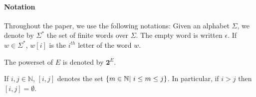 \paragraph{Notation} Throughout the paper, we use the following
notations: Given an alphabet $\Sigma$, we denote by $\Sigma^*$
 the set of finite words over $\Sigma$. The empty word is written $\epsilon$. If $w\in \Sigma^*$, $w[i]$ is the $i^{th}$ letter of the word $w$.

The powerset of $E$ is denoted by $\mathbf 2^E$.

If $i, j \in \mathbb{N}$, $[i,j]$ denotes the set $\set{m \in \mathbb{N} |\ i\leq m\leq j}$. In particular, if $ i>j$ then $[i,j]=\emptyset$.  
